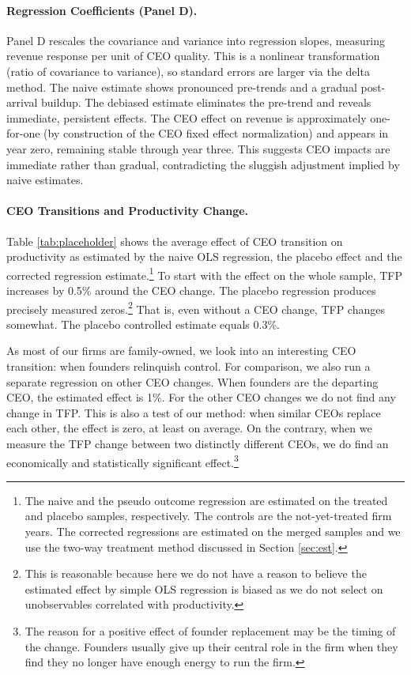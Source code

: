 \documentclass[11pt,a4paper]{article}
\begin{document}
\paragraph{Regression Coefficients (Panel D).} Panel D rescales the covariance and variance into regression slopes, measuring revenue response per unit of CEO quality. This is a nonlinear transformation (ratio of covariance to variance), so standard errors are larger via the delta method. The naive estimate shows pronounced pre-trends and a gradual post-arrival buildup. The debiased estimate eliminates the pre-trend and reveals immediate, persistent effects. The CEO effect on revenue is approximately one-for-one (by construction of the CEO fixed effect normalization) and appears in year zero, remaining stable through year three. This suggests CEO impacts are immediate rather than gradual, contradicting the sluggish adjustment implied by naive estimates.


\paragraph{CEO Transitions and Productivity Change.} Table \ref{tab:placeholder} shows the average effect of CEO transition on productivity as estimated by the naive OLS regression, the placebo effect and the corrected regression estimate.\footnote{The naive and the pseudo outcome regression are estimated on the treated and placebo samples, respectively. The controls are the not-yet-treated firm years. The corrected regressions are estimated on the merged samples and we use the two-way treatment method discussed in Section \ref{sec:est}.} To start with the effect on the whole sample, TFP increases by 0.5\% around the CEO change. The placebo regression produces precisely measured zeros.\footnote{This is reasonable because here we do not have a reason to believe the estimated effect by simple OLS regression is biased as we do not select on unobservables correlated with productivity.} That is, even without a CEO change, TFP changes somewhat. The placebo controlled estimate equals 0.3\%.

As most of our firms are family-owned, we look into an interesting CEO transition: when founders relinquish control. For comparison, we also run a separate regression on other CEO changes. When founders are the departing CEO, the estimated effect is 1\%. For the other CEO changes we do not find any change in TFP. This is also a test of our method: when similar CEOs replace each other, the effect is zero, at least on average. On the contrary, when we measure the TFP change between two distinctly different CEOs, we do find an economically and statistically significant effect.\footnote{The reason for a positive effect of founder replacement may be the timing of the change. Founders usually give up their central role in the firm when they find they no longer have enough energy to run the firm.} 
\end{document}
